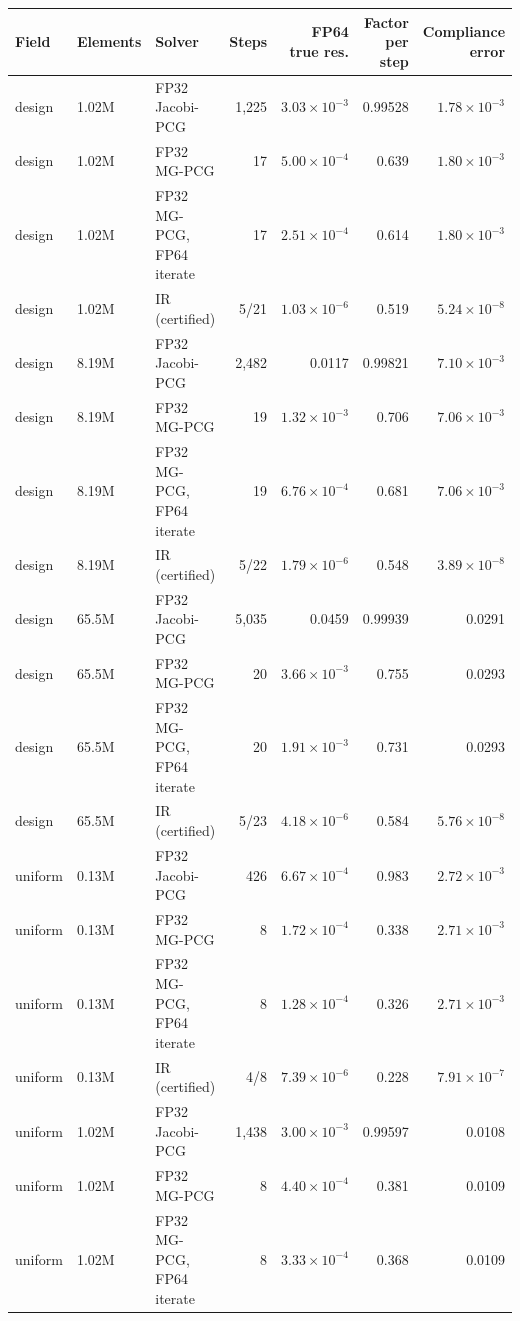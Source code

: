 \begin{tabular}{lllrrrr}
\toprule
Field & Elements & Solver & Steps & FP64 true res. & Factor per step & Compliance error \\
\midrule
design & 1.02M & FP32 Jacobi-PCG & 1{,}225 & $3.03\times10^{-3}$ & 0.99528 & $1.78\times10^{-3}$ \\
design & 1.02M & FP32 MG-PCG & 17 & $5.00\times10^{-4}$ & 0.639 & $1.80\times10^{-3}$ \\
design & 1.02M & FP32 MG-PCG, FP64 iterate & 17 & $2.51\times10^{-4}$ & 0.614 & $1.80\times10^{-3}$ \\
design & 1.02M & IR (certified) & 5/21 & $1.03\times10^{-6}$ & 0.519 & $5.24\times10^{-8}$ \\
design & 8.19M & FP32 Jacobi-PCG & 2{,}482 & 0.0117 & 0.99821 & $7.10\times10^{-3}$ \\
design & 8.19M & FP32 MG-PCG & 19 & $1.32\times10^{-3}$ & 0.706 & $7.06\times10^{-3}$ \\
design & 8.19M & FP32 MG-PCG, FP64 iterate & 19 & $6.76\times10^{-4}$ & 0.681 & $7.06\times10^{-3}$ \\
design & 8.19M & IR (certified) & 5/22 & $1.79\times10^{-6}$ & 0.548 & $3.89\times10^{-8}$ \\
design & 65.5M & FP32 Jacobi-PCG & 5{,}035 & 0.0459 & 0.99939 & 0.0291 \\
design & 65.5M & FP32 MG-PCG & 20 & $3.66\times10^{-3}$ & 0.755 & 0.0293 \\
design & 65.5M & FP32 MG-PCG, FP64 iterate & 20 & $1.91\times10^{-3}$ & 0.731 & 0.0293 \\
design & 65.5M & IR (certified) & 5/23 & $4.18\times10^{-6}$ & 0.584 & $5.76\times10^{-8}$ \\
uniform & 0.13M & FP32 Jacobi-PCG & 426 & $6.67\times10^{-4}$ & 0.983 & $2.72\times10^{-3}$ \\
uniform & 0.13M & FP32 MG-PCG & 8 & $1.72\times10^{-4}$ & 0.338 & $2.71\times10^{-3}$ \\
uniform & 0.13M & FP32 MG-PCG, FP64 iterate & 8 & $1.28\times10^{-4}$ & 0.326 & $2.71\times10^{-3}$ \\
uniform & 0.13M & IR (certified) & 4/8 & $7.39\times10^{-6}$ & 0.228 & $7.91\times10^{-7}$ \\
uniform & 1.02M & FP32 Jacobi-PCG & 1{,}438 & $3.00\times10^{-3}$ & 0.99597 & 0.0108 \\
uniform & 1.02M & FP32 MG-PCG & 8 & $4.40\times10^{-4}$ & 0.381 & 0.0109 \\
uniform & 1.02M & FP32 MG-PCG, FP64 iterate & 8 & $3.33\times10^{-4}$ & 0.368 & 0.0109 \\

\end{tabular}
